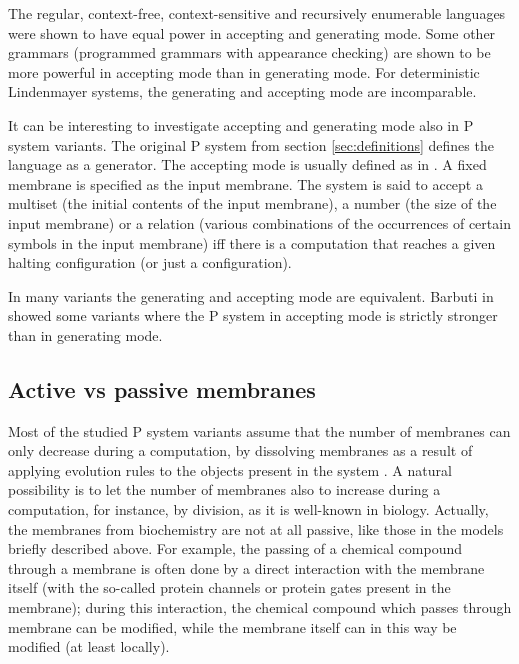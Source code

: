 
The regular, context-free, context-sensitive and recursively enumerable languages were shown to have equal power in accepting and generating mode.
Some other grammars (programmed grammars with appearance checking) are shown to be more powerful in accepting mode than in generating mode.
For deterministic Lindenmayer systems, the generating and accepting mode are incomparable.


It can be interesting to investigate accepting and generating mode also in P system variants. The original P system from section \ref{sec:definitions} defines the language as a generator. The accepting mode is usually defined as in \cite{Besozzi:PhD:2004}. A fixed membrane is specified as the input membrane. The system is said to accept a multiset (the initial contents of the input membrane), a number (the size of the input membrane) or a relation (various combinations of the occurrences of certain symbols in the input membrane) iff there is a computation that reaches a given halting configuration (or just a configuration).


In many variants the generating and accepting mode are equivalent. Barbuti in \cite{Barbuti:2010:AcceptingGenerating} showed some variants where the P system in accepting mode is strictly stronger than in generating mode.


\subsection{Active vs passive membranes} %
\label{sub:active_vs_passive_membranes}

Most of the studied P system variants assume that the number of membranes can only decrease during a computation, by dissolving membranes as a result of applying evolution rules to the objects present in the system \cite{Paun99ActiveMembranes}.
A natural possibility is to let the number of membranes also to increase during a computation, for instance, by division, as it is well-known in biology. Actually, the membranes from biochemistry are not at all passive, like those in the models briefly described above.
For example, the passing of a chemical compound through a membrane is often done by a direct interaction with the membrane itself (with the so-called protein channels or protein gates present in the membrane); during this interaction, the chemical compound which passes through membrane can be modified, while the membrane itself can in this way be modified (at least locally).

